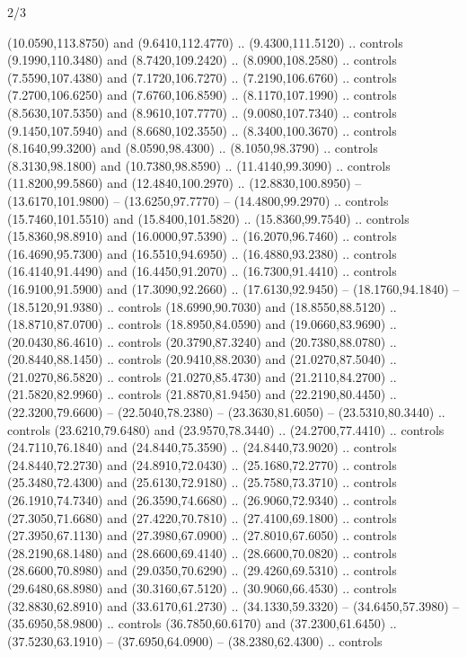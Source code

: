 \begin{flagdescription}{2/3}
\begin{scope}[xshift=0.5\flaglength,yshift=0.5\flagwidth,scale=\stretchfactor]
\begin{scope}[scale=0.001645\flagwidth,yshift=65mm,xshift=-63mm]
\begin{scope}[y=0.80pt, x=0.80pt, yscale=-1,]
\begin{scope}[cm={{1.33333,0.0,0.0,1.33333,(0.0,1e-05)}}]
  (10.0590,113.8750) and (9.6410,112.4770) .. (9.4300,111.5120) .. controls
  (9.1990,110.3480) and (8.7420,109.2420) .. (8.0900,108.2580) .. controls
  (7.5590,107.4380) and (7.1720,106.7270) .. (7.2190,106.6760) .. controls
  (7.2700,106.6250) and (7.6760,106.8590) .. (8.1170,107.1990) .. controls
  (8.5630,107.5350) and (8.9610,107.7770) .. (9.0080,107.7340) .. controls
  (9.1450,107.5940) and (8.6680,102.3550) .. (8.3400,100.3670) .. controls
  (8.1640,99.3200) and (8.0590,98.4300) .. (8.1050,98.3790) .. controls
  (8.3130,98.1800) and (10.7380,98.8590) .. (11.4140,99.3090) .. controls
  (11.8200,99.5860) and (12.4840,100.2970) .. (12.8830,100.8950) --
  (13.6170,101.9800) -- (13.6250,97.7770) -- (14.4800,99.2970) .. controls
  (15.7460,101.5510) and (15.8400,101.5820) .. (15.8360,99.7540) .. controls
  (15.8360,98.8910) and (16.0000,97.5390) .. (16.2070,96.7460) .. controls
  (16.4690,95.7300) and (16.5510,94.6950) .. (16.4880,93.2380) .. controls
  (16.4140,91.4490) and (16.4450,91.2070) .. (16.7300,91.4410) .. controls
  (16.9100,91.5900) and (17.3090,92.2660) .. (17.6130,92.9450) --
  (18.1760,94.1840) -- (18.5120,91.9380) .. controls (18.6990,90.7030) and
  (18.8550,88.5120) .. (18.8710,87.0700) .. controls (18.8950,84.0590) and
  (19.0660,83.9690) .. (20.0430,86.4610) .. controls (20.3790,87.3240) and
  (20.7380,88.0780) .. (20.8440,88.1450) .. controls (20.9410,88.2030) and
  (21.0270,87.5040) .. (21.0270,86.5820) .. controls (21.0270,85.4730) and
  (21.2110,84.2700) .. (21.5820,82.9960) .. controls (21.8870,81.9450) and
  (22.2190,80.4450) .. (22.3200,79.6600) -- (22.5040,78.2380) --
  (23.3630,81.6050) -- (23.5310,80.3440) .. controls (23.6210,79.6480) and
  (23.9570,78.3440) .. (24.2700,77.4410) .. controls (24.7110,76.1840) and
  (24.8440,75.3590) .. (24.8440,73.9020) .. controls (24.8440,72.2730) and
  (24.8910,72.0430) .. (25.1680,72.2770) .. controls (25.3480,72.4300) and
  (25.6130,72.9180) .. (25.7580,73.3710) .. controls (26.1910,74.7340) and
  (26.3590,74.6680) .. (26.9060,72.9340) .. controls (27.3050,71.6680) and
  (27.4220,70.7810) .. (27.4100,69.1800) .. controls (27.3950,67.1130) and
  (27.3980,67.0900) .. (27.8010,67.6050) .. controls (28.2190,68.1480) and
  (28.6600,69.4140) .. (28.6600,70.0820) .. controls (28.6600,70.8980) and
  (29.0350,70.6290) .. (29.4260,69.5310) .. controls (29.6480,68.8980) and
  (30.3160,67.5120) .. (30.9060,66.4530) .. controls (32.8830,62.8910) and
  (33.6170,61.2730) .. (34.1330,59.3320) -- (34.6450,57.3980) --
  (35.6950,58.9800) .. controls (36.7850,60.6170) and (37.2300,61.6450) ..
  (37.5230,63.1910) -- (37.6950,64.0900) -- (38.2380,62.4300) .. controls

\end{scope}
\end{scope}
\end{scope}
\end{scope}
\end{flagdescription}
